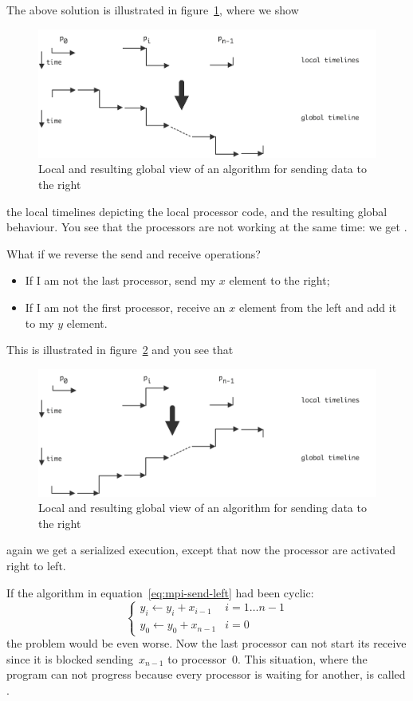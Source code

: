 The above solution is illustrated in figure~\ref{fig:wave_right_1},
where we show
\begin{figure}
  \includegraphics[scale=.14]{graphics-public/wave_right_1}
  \caption{Local and resulting global view of an algorithm for sending
    data to the right}
  \label{fig:wave_right_1}
\end{figure}
the local timelines depicting the local processor code, and the resulting
global behaviour. You see that the processors are not working at the
same time: we get .

What if we reverse the send and receive operations?
\begin{itemize}
\item If I am not the last processor, send my $x$ element to the
  right;
\item If I am not the first processor, receive an $x$ element from the
  left and add it to my $y$ element.
\end{itemize}
This is illustrated in figure~\ref{fig:wave_right_2} and you see that
\begin{figure}
  \includegraphics[scale=.14]{graphics-public/wave_right_2}
  \caption{Local and resulting global view of an algorithm for sending
    data to the right}
  \label{fig:wave_right_2}
\end{figure}
again we get a serialized execution, except that now the processor are
activated right to left.

If the algorithm in equation~\ref{eq:mpi-send-left} had been cyclic:
\begin{equation}
\begin{cases}
y_i\leftarrow y_i+x_{i-1}&i=1\ldots n-1\\ 
y_0\leftarrow y_0+x_{n-1}&i=0
\end{cases}
\label{eq:cyclic-add}
\end{equation}
the problem would be even worse. Now the last processor can not start
its receive since it is blocked sending~$x_{n-1}$ to processor~0. This
situation, where the program can not progress because every processor is
waiting for another, is called . 

